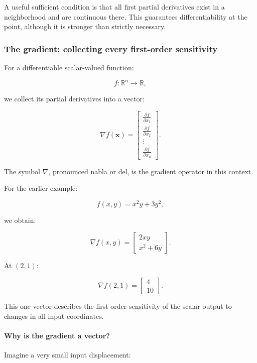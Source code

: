 A useful sufficient condition is that all first partial derivatives exist in a neighborhood and are continuous there. This guarantees differentiability at the point, although it is stronger than strictly necessary.

\subsubsection{The gradient: collecting every first-order sensitivity}\label{02-foundations-ii-ch021-the-gradient-collecting-every-first-order-sensitivity}

For a differentiable scalar-valued function:

\[
f:\mathbb R^n\rightarrow\mathbb R,
\]

we collect its partial derivatives into a vector:

\[
\boxed{ \nabla f(\mathbf x)= \begin{bmatrix} \frac{\partial f}{\partial x_1}\\ \frac{\partial f}{\partial x_2}\\ \vdots\\ \frac{\partial f}{\partial x_n} \end{bmatrix} }.
\]

The symbol \(\nabla\), pronounced nabla or del, is the gradient operator in this context.

For the earlier example:

\[
f(x,y)=x^2y+3y^2,
\]

we obtain:

\[
\nabla f(x,y)= \begin{bmatrix} 2xy\\ x^2+6y \end{bmatrix}.
\]

At \((2,1)\):

\[
\nabla f(2,1)= \begin{bmatrix}4\\10\end{bmatrix}.
\]

This one vector describes the first-order sensitivity of the scalar output to changes in all input coordinates.

\paragraph{Why is the gradient a vector?}\label{02-foundations-ii-ch021-why-is-the-gradient-a-vector}

Imagine a very small input displacement:

